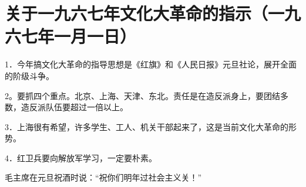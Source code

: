 \section[关于一九六七年文化大革命的指示（一九六七年一月一日）]{关于一九六七年文化大革命的指示（一九六七年一月一日）}


1．今年搞文化大革命的指导思想是《红旗》和《人民日报》元旦社论，展开全面的阶级斗争。

2。要抓四个重点。北京、上海、天津、东北。责任是在造反派身上，要团结多数，造反派队伍要超过一倍以上。

3．上海很有希望，许多学生、工人、机关干部起来了，这是当前文化大革命的形势。

4．红卫兵要向解放军学习，一定要朴素。

毛主席在元旦祝酒时说：“祝你们明年过社会主义关！”



